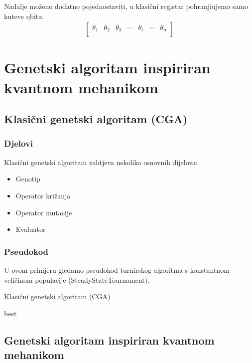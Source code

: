 \documentclass[times, utf8, zavrsni]{fer}
\begin{document}
Nadalje moženo dodatno pojednostaviti, u klasični registar pohranjiujemo samo kuteve qbita:
\begin{align*}
\begin{bmatrix}
\theta_1 & \theta_2 & \theta_3 & \cdots & \theta_i & \cdots & \theta_n \\
\end{bmatrix}
\end{align*}



\chapter{Genetski algoritam inspiriran kvantnom mehanikom}
\section{Klasični genetski algoritam (CGA)}
\subsection{Djelovi}
Klasični genetski algoritam zahtjeva nekoliko osnovnih dijelova:
\begin{itemize}
\item Genotip 
\item Operator križanja 
\item Operator mutacije
\item Evaluator 
\end{itemize}

\subsection{Pseudokod}
U ovom primjeru gledamo pseudokod turnirskog algoritma s konstantnom veličinom populacije (SteadyStateTournament).

\begin{algorithm}
\caption{Klasični genetski algoritam (CGA)}
\label{algo:cga}
\begin{algorithmic}
\STATE{}
\ENDWHILE
\RETURN best
\end{algorithmic}
\end{algorithm}

\section{Genetski algoritam inspiriran kvantnom mehanikom}
\end{document}
